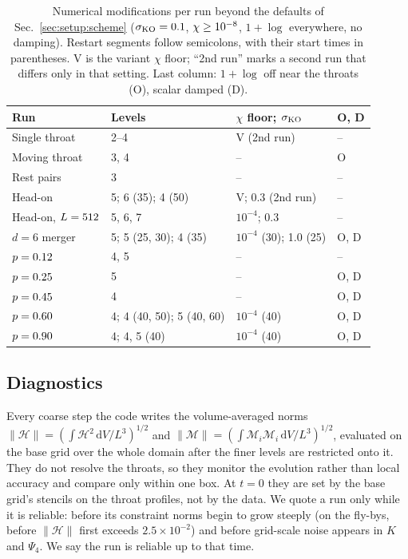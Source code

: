 \documentclass[twocolumn,floatfix,aps,prd,superscriptaddress,nofootinbib]{revtex4-2}
\begin{document}
\begin{table}[t]
\caption{Numerical modifications per run beyond the defaults of Sec.~\ref{sec:setup:scheme} ($\sigma_{\rm KO}=0.1$, $\chi\ge10^{-8}$, $1{+}\log$ everywhere, no damping). Restart segments follow semicolons, with their start times in parentheses. V is the variant $\chi$ floor; ``2nd run'' marks a second run that differs only in that setting. Last column: $1{+}\log$ off near the throats (O), scalar damped (D).}
\label{tab:mods}
\scriptsize
\setlength{\tabcolsep}{2pt}
\begin{ruledtabular}
\begin{tabular}{llll}
Run & Levels & $\chi$ floor; $\sigma_{\rm KO}$ & O, D \\
\hline
Single throat & 2--4 & V (2nd run) & -- \\
Moving throat & 3, 4 & -- & O \\
Rest pairs & 3 & -- & -- \\
Head-on & 5; 6 (35); 4 (50) & V; 0.3 (2nd run) & -- \\
Head-on, $L=512$ & 5, 6, 7 & $10^{-4}$; 0.3 & -- \\
$d=6$ merger & 5; 5 (25, 30); 4 (35) & $10^{-4}$ (30); 1.0 (25) & O, D \\
$p=0.12$ & 4, 5 & -- & -- \\
$p=0.25$ & 5 & -- & O, D \\
$p=0.45$ & 4 & -- & O, D \\
$p=0.60$ & 4; 4 (40, 50); 5 (40, 60) & $10^{-4}$ (40) & O, D \\
$p=0.90$ & 4; 4, 5 (40) & $10^{-4}$ (40) & O, D \\
\end{tabular}
\end{ruledtabular}
\end{table}

\subsection{Diagnostics}
\label{sec:setup:diagnostics}

Every coarse step the code writes the volume-averaged norms $\|\mathcal H\|=(\int\mathcal H^2\,\mathrm{d}V/L^3)^{1/2}$ and $\|\mathcal M\|=(\int\mathcal M_i\mathcal M_i\,\mathrm{d}V/L^3)^{1/2}$, evaluated on the base grid over the whole domain after the finer levels are restricted onto it. They do not resolve the throats, so they monitor the evolution rather than local accuracy and compare only within one box. At $t=0$ they are set by the base grid's stencils on the throat profiles, not by the data. We quote a run only while it is reliable: before its constraint norms begin to grow steeply (on the fly-bys, before $\|\mathcal H\|$ first exceeds $2.5\times10^{-2}$) and before grid-scale noise appears in $K$ and $\Psi_4$. We say the run is reliable up to that time.
\end{document}
